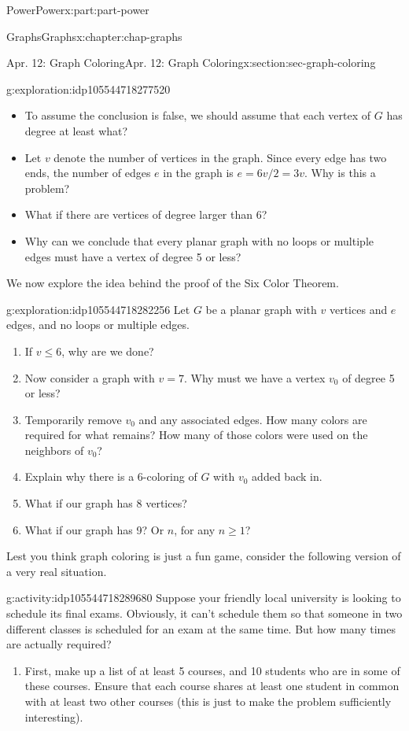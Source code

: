 \documentclass[oneside,10pt,]{book}
\numberwithin{equation}{section}
\renewcommand{\le}{\leqslant}
\renewcommand{\ge}{\geqslant}
\begin{document}
\begin{partptx}{Power}{}{Power}{}{}{x:part:part-power}
\begin{chapterptx}{Graphs}{}{Graphs}{}{}{x:chapter:chap-graphs}
\begin{sectionptx}{Apr. 12: Graph Coloring}{}{Apr. 12: Graph Coloring}{}{}{x:section:sec-graph-coloring}
\begin{exploration}{}{g:exploration:idp105544718277520}
\begin{itemize}[label=\textbullet]
\item{}To assume the conclusion is false, we should assume that each vertex of \(G\) has degree at least what?%
\item{}Let \(v\) denote the number of vertices in the graph. Since every edge has two ends, the number of edges \(e\) in the graph is \(e =6v/2 = 3v\). Why is this a problem?%
\item{}What if there are vertices of degree larger than 6?%
\item{}Why can we conclude that every planar graph with no loops or multiple edges must have a vertex of degree 5 or less?%
\end{itemize}
\end{exploration}%
We now explore the idea behind the proof of the Six Color Theorem.%
\begin{exploration}{}{g:exploration:idp105544718282256}%
Let \(G\) be a planar graph with \(v\) vertices and \(e\) edges, and no loops or multiple edges.%
%
\begin{enumerate}
\item{}If \(v \le 6\), why are we done?%
\item{}Now consider a graph with \(v = 7\). Why must we have a vertex \(v_0\) of degree 5 or less?%
\item{}Temporarily remove \(v_0\) and any associated edges. How many colors are required for what remains? How many of those colors were used on the neighbors of \(v_0\)?%
\item{}Explain why there is a 6-coloring of \(G\) with \(v_0\) added back in.%
\item{}What if our graph has 8 vertices?%
\item{}What if our graph has 9? Or \(n\), for any \(n\ge 1\)?%
\end{enumerate}
\end{exploration}%
Lest you think graph coloring is just a fun game, consider the following version of a very real situation.%
\begin{activity}{}{g:activity:idp105544718289680}%
Suppose your friendly local university is looking to schedule its final exams. Obviously, it can't schedule them so that someone in two different classes is scheduled for an exam at the same time. But how many times are actually required?%
%
\begin{enumerate}
\item{}First, make up a list of at least 5 courses, and 10 students who are in some of these courses. Ensure that each course shares at least one student in common with at least two other courses (this is just to make the problem sufficiently interesting).%

\end{enumerate}
\end{activity}
\end{sectionptx}
\end{chapterptx}
\end{partptx}
\end{document}
